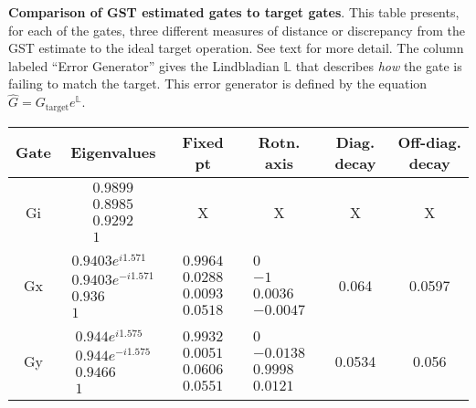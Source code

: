 {\begin{table}[h]
\begin{center}
\caption{\textbf{Comparison of GST estimated gates to target gates}.  This table presents, for each of the gates, three different measures of distance or discrepancy from the GST estimate to the ideal target operation.  See text for more detail.  The column labeled ``Error Generator'' gives the Lindbladian $\mathbb{L}$ that describes \emph{how} the gate is failing to match the target.  This error generator is defined by the equation $\hat{G} = G_{\mathrm{target}}e^{\mathbb{L}}$. \label{bestTargetSpamGatesetVsTargetTable}}
\end{center}
\end{table}

\begin{table}[h]
\begin{center}
\begin{tabular}[l]{|c|c|c|c|c|c|}
\hline
Gate & Eigenvalues & Fixed pt & Rotn. axis & Diag. decay & Off-diag. decay \\ \hline
Gi & $ \begin{array}{c}
0.9899 \\ 
0.8985 \\ 
0.9292 \\ 
1
 \end{array} $
 & X & X & X & X \\ \hline
Gx & $ \begin{array}{c}
0.9403e^{i1.571} \\ 
0.9403e^{-i1.571} \\ 
0.936 \\ 
1
 \end{array} $
 & $ \begin{array}{c}
0.9964 \\ 
0.0288 \\ 
0.0093 \\ 
0.0518
 \end{array} $
 & $ \begin{array}{c}
0 \\ 
-1 \\ 
0.0036 \\ 
-0.0047
 \end{array} $
 & 0.064 & 0.0597 \\ \hline
Gy & $ \begin{array}{c}
0.944e^{i1.575} \\ 
0.944e^{-i1.575} \\ 
0.9466 \\ 
1
 \end{array} $
 & $ \begin{array}{c}
0.9932 \\ 
0.0051 \\ 
0.0606 \\ 
0.0551
 \end{array} $
 & $ \begin{array}{c}
0 \\ 
-0.0138 \\ 
0.9998 \\ 
0.0121
 \end{array} $
 & 0.0534 & 0.056 \\ \hline
\end{tabular}


\end{center}
\end{table}}
